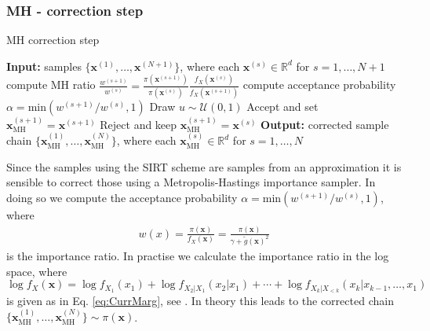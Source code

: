 \subsubsection{MH - correction step}
\begin{algorithm}[!ht]
	\caption{MH correction step}
	\begin{algorithmic}[1]
		\STATE \textbf{Input:} samples $\{ \bm{x}^{(1)},\dots, \bm{x}^{(N+1)} \} $, where each $\bm{x}^{(s)} \in \mathbb{R}^d$ for $s = 1, \dots, N+1$
		\STATE compute MH ratio $\frac{w^{(s+1)}}{w^{(s)} } =\frac{\pi(\bm{x}^{(s+1)})}{\pi(\bm{x}^{(s)})} \frac{f_X(\bm{x}^{(s)})}{f_X(\bm{x}^{(s+1)})}$ 
		\STATE compute acceptance probability $\alpha = \text{min}(w^{(s+1)}/w^{(s)}, 1)$ 
		\STATE Draw $u \sim \mathcal{U}(0,1)$
		\STATE Accept and set $\bm{x}_{\text{MH}}^{(s+1)} = \bm{x}^{(s+1)}$
		\ELSE  
		\STATE Reject and keep $\bm{x}_{\text{MH}}^{(s+1)} = \bm{x}^{(s)}$
		\ENDIF
		\ENDFOR
		\STATE \textbf{Output:} corrected sample chain $\{ \bm{x}_{\text{MH}}^{(1)},\dots, \bm{x}_{\text{MH}}^{(N)} \} $, where each $\bm{x}_{\text{MH}}^{(s)} \in \mathbb{R}^d$ for $s = 1, \dots, N$
	\end{algorithmic}
	\label{alg:SIRT}
\end{algorithm}
Since the samples using the SIRT scheme are samples from an approximation it is sensible to correct those using a Metropolis-Hastings importance sampler.
In doing so we compute the acceptance probability $  \alpha = \text{min}(w^{(s+1)}/w^{(s)}, 1)$, where 
\begin{align}
	w(x) = \frac{\pi(\bm{x})}{f_X(\bm{x})} = \frac{\pi(\bm{x})}{\gamma + \tilde{g}(\bm{x})^2} 
\end{align}
is the importance ratio.
In practise we calculate the importance ratio in the log space, where $\log f_X(\bm{x})  =  \log f_{X_1}(x_1) + \log f_{X_2|X_1}(x_2|x_1) + \cdots + \log f_{X_k|X_{<k}}(x_k|x_{k-1},\dots,x_1)$ is given as in Eq. \ref{eq:CurrMarg}, see \cite{dolgov2020approximation}.
In theory this leads to the corrected chain $ \{ \bm{x}_{\text{MH}}^{(1)},\dots, \bm{x}_{\text{MH}}^{(N)}  \} \sim \pi(\bm{x}) $.


